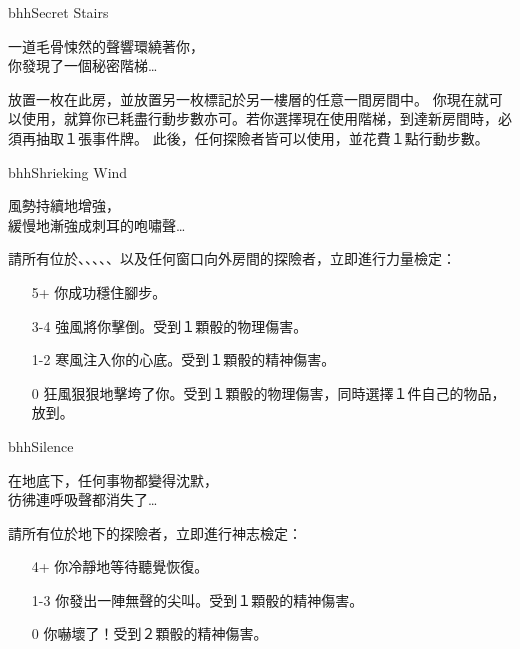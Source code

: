 \linebreak[0]%
\begin{EventCard}{bhh}{Secret Stairs}
	\begin{CardStory}
		一道毛骨悚然的聲響環繞著你，\\
		你發現了一個秘密階梯…
	\end{CardStory}
	放置一枚在此房，並放置另一枚標記於另一樓層的任意一間房間中。\smallbreak
	你現在就可以使用，就算你已耗盡行動步數亦可。若你選擇現在使用階梯，到達新房間時，必須再抽取１張事件牌。\smallbreak
	此後，任何探險者皆可以使用，並花費１點行動步數。\smallbreak
\end{EventCard}%
\linebreak[0]%
\begin{EventCard}{bhh}{Shrieking Wind}
	\begin{CardStory}
		風勢持續地增強，\\
		緩慢地漸強成刺耳的咆嘯聲…
	\end{CardStory}
	請所有位於、、、、、以及任何窗口向外房間的探險者，立即進行力量檢定：
	\begin{itemize}
		\item[5+] 你成功穩住腳步。
		\item[3-4] 強風將你擊倒。受到１顆骰的物理傷害。
		\item[1-2] 寒風注入你的心底。受到１顆骰的精神傷害。
		\item[0] 狂風狠狠地擊垮了你。受到１顆骰的物理傷害，同時選擇１件自己的物品，放到。
	\end{itemize}
\end{EventCard}%
\linebreak[0]%
\begin{EventCard}{bhh}{Silence}
	\begin{CardStory}
		在地底下，任何事物都變得沈默，\\
		彷彿連呼吸聲都消失了…
	\end{CardStory}
	請所有位於地下的探險者，立即進行神志檢定：
	\begin{itemize}
		\item[4+] 你冷靜地等待聽覺恢復。
		\item[1-3] 你發出一陣無聲的尖叫。受到１顆骰的精神傷害。
		\item[0] 你嚇壞了！受到２顆骰的精神傷害。
	\end{itemize}
\end{EventCard}%
\linebreak[0]%
